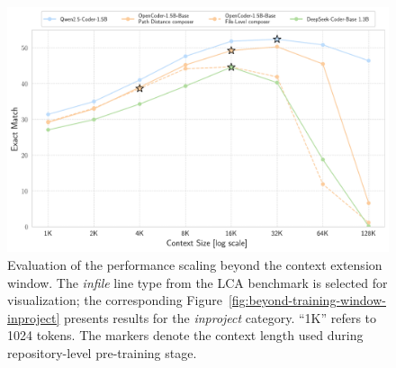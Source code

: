 \begin{figure}[ht]
    \centering
    \includegraphics[width=\textwidth]{figures/beyond-training-window-infile.pdf}
    \caption{Evaluation of the performance scaling beyond the context extension window. The \textit{infile} line type from the LCA benchmark is selected for visualization; the corresponding Figure~\ref{fig:beyond-training-window-inproject} presents results for the \textit{inproject} category. ``1K'' refers to 1024 tokens. The \raisebox{-0.3ex}{\FiveStarOpen} markers denote the context length used during repository-level pre-training stage.}\label{fig:beyond-training-window-infile}
\end{figure}
